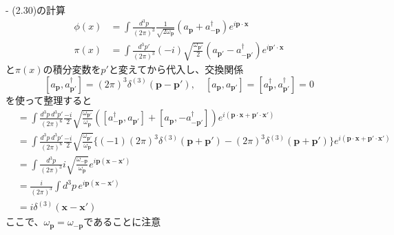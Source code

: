 - (2.30)の計算
\begin{align*}
  \phi(x) & = \int \frac{d^3 p}{(2\pi)^3} \frac{1}{\sqrt{2\omega_{\textbf{p}}}} ( a_{\textbf{p}} + a_{-\textbf{p}}^\dagger ) e^{i \textbf{p} \cdot \textbf{x}} \\
  \pi(x)  & = \int \frac{d^3 p'}{(2\pi)^3} (-i) \sqrt{\frac{\omega_{\textbf{p}'}}{2}} ( a_{\textbf{p}'} - a_{-\textbf{p}'}^\dagger )e^{i \textbf{p}' \cdot \textbf{x}}
\end{align*}
と$\pi(x)$の積分変数を$p'$と変えてから代入し、交換関係
\[
  [a_{\textbf{p}}, a^\dagger_{\textbf{p}'}] = (2\pi)^3 \delta^{(3)}(\textbf{p} - \textbf{p}'), \quad [a_{\textbf{p}}, a_{\textbf{p}'}] = [a^\dagger_{\textbf{p}}, a^\dagger_{\textbf{p}'}] = 0
\]
を使って整理すると
\begin{align*}
  [\phi(x), \pi(x')]
   & = \int \frac{d^3 p \, d^3 p'}{(2\pi)^6} \frac{-i}{2} \sqrt{\frac{\omega_{\textbf{p}'}}{\omega_{\textbf{p}}}} ([a^\dagger_{-\textbf{p}}, a_{\textbf{p}'}] + [a_{\textbf{p}}, -a^\dagger_{-\textbf{p}'}]) e^{i(\textbf{p} \cdot \textbf{x} + \textbf{p}' \cdot \textbf{x}')} \\
   & = \int \frac{d^3 p \, d^3 p'}{(2\pi)^6} \frac{-i}{2} \sqrt{\frac{\omega_{\textbf{p}'}}{\omega_{\textbf{p}}}} \{ (-1)(2\pi)^3 \delta^{(3)}(\textbf{p} + \textbf{p}') - (2\pi)^3 \delta^{(3)}(\textbf{p} + \textbf{p}') \} e^{i(\textbf{p} \cdot \textbf{x} + \textbf{p}' \cdot \textbf{x}')} \\
   & = \int \frac{d^3 p}{(2\pi)^3} i \sqrt{\frac{\omega_{-\textbf{p}}}{\omega_{\textbf{p}}}} e^{i \textbf{p}(\textbf{x} - \textbf{x}')} \\
   & = \frac{i}{(2\pi)^3} \int d^3 p \, e^{i \textbf{p}(\textbf{x} - \textbf{x}')} \\
   & = i \delta^{(3)}(\textbf{x} - \textbf{x}')
\end{align*}
ここで、$\omega_{\textbf{p}} = \omega_{-\textbf{p}}$であることに注意

